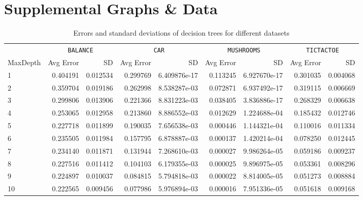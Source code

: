 \documentclass[screen, authorversion, nonacm, sigconf]{acmart}
\begin{document}



\appendix

\section{Supplemental Graphs \& Data}

\begin{table}
  \centering
  \begin{tabular}{lrrrrrrrr}
    \toprule
    {} & \multicolumn{2}{c}{\texttt{BALANCE}} & \multicolumn{2}{c}{\texttt{CAR}} & \multicolumn{2}{c}{\texttt{MUSHROOMS}} & \multicolumn{2}{c}{\texttt{TICTACTOE}} \\
    \cmidrule(r){2-3} \cmidrule(lr){4-5} \cmidrule(lr){6-7} \cmidrule(l){8-9} 
    MaxDepth &     Avg Error & SD &     Avg Error & SD &     Avg Error & SD &     Avg Error & SD \\
    \midrule
    1        &  0.404191 &           0.012534 &  0.299769 &       6.409876e-17 &  0.113245 &       6.927670e-17 &  0.301035 &           0.004068 \\
    2        &  0.359704 &           0.019186 &  0.262998 &       8.538287e-03 &  0.072871 &       6.937492e-17 &  0.319115 &           0.006669 \\
    3        &  0.299806 &           0.013906 &  0.221366 &       8.831223e-03 &  0.038405 &       3.836886e-17 &  0.268329 &           0.006638 \\
    4        &  0.253065 &           0.012958 &  0.213860 &       8.886552e-03 &  0.012629 &       1.224688e-04 &  0.185432 &           0.012746 \\
    5        &  0.227718 &           0.011899 &  0.190035 &       7.656538e-03 &  0.000446 &       1.144321e-04 &  0.110016 &           0.011334 \\
    6        &  0.235505 &           0.011984 &  0.157795 &       6.878887e-03 &  0.000137 &       1.420214e-04 &  0.078250 &           0.012445 \\
    7        &  0.234140 &           0.011871 &  0.131944 &       7.268610e-03 &  0.000027 &       9.986264e-05 &  0.059186 &           0.009237 \\
    8        &  0.227516 &           0.011412 &  0.104103 &       6.179355e-03 &  0.000025 &       9.896975e-05 &  0.053361 &           0.008296 \\
    9        &  0.224897 &           0.010037 &  0.084815 &       5.794818e-03 &  0.000022 &       8.814005e-05 &  0.051273 &           0.008884 \\
    10       &  0.222565 &           0.009456 &  0.077986 &       5.976894e-03 &  0.000016 &       7.951336e-05 &  0.051618 &           0.009168 \\
    \bottomrule
  \end{tabular}
  \caption{Errors and standard deviations of decision trees for different datasets}
  \label{tab:errs}
\end{table}
\end{document}
